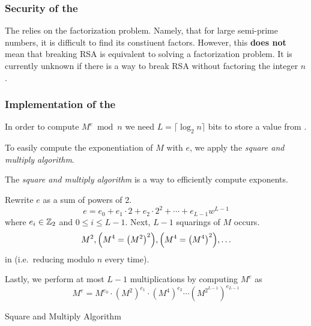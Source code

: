 \subsubsection{Security of the }\label{subsubsec:RSA_Encryption_Scheme-Security}
The  relies on the factorization problem.
Namely, that for large semi-prime numbers, it is difficult to find its constiuent  factors.
However, this \textbf{does not} mean that breaking RSA is equivalent to solving a factorization problem.
It is currently unknown if there is a way to break RSA without factoring the integer $n$.

\subsubsection{Implementation of the }\label{subsubsec:RSA_Encryption_Scheme-Implementation}
In order to compute $M^{e} \bmod n$ we need $L = \lceil \log_{2} n \rceil$ bits to store a value from .

To easily compute the exponentiation of $M$ with $e$, we apply the \emph{square and multiply algorithm}.
\begin{definition}\label{def:Square_Multiply_Algorithm}
  The \emph{square and multiply algorithm} is a way to efficiently compute exponents.

  \begin{algorithm}[H]
    \DontPrintSemicolon{}

    \BlankLine{}
    Rewrite $e$ as a sum of powers of 2.
    \begin{equation*}
      e = e_{0} + e_{1} \cdot 2 + e_{2} \cdot 2^{2} + \cdots + e_{L-1} w^{L-1}
    \end{equation*}
    where $e_{i} \in \operatorname{\mathbb{Z}}_{2}$ and $0 \leq i \leq L-1$. \;
    Next, $L-1$ squarings of $M$ occurs.
    \begin{equation*}
      M^{2}, \Bigl( M^{4} = {\left( M^{2} \right)}^{2} \Bigr), \Bigl( M^{4} = {\left( M^{4} \right)}^{2} \Bigr), \ldots
    \end{equation*}
    in  (i.e.\ reducing modulo $n$ every time). \;

    Lastly, we perform at most $L-1$ multiplications by computing $M^{e}$ as
    \begin{equation*}
      M^{e} = M^{e_{0}} \cdot {\left( M^{2} \right)}^{e_{1}} \cdot {\left( M^{4} \right)}^{e_{2}} \cdots {\left( M^{2^{L-1}} \right)}^{e_{L-1}}
    \end{equation*}
    \caption{Square and Multiply Algorithm}
    \label{algo:Square_Multiply_Algorithm}
  \end{algorithm}
\end{definition}

